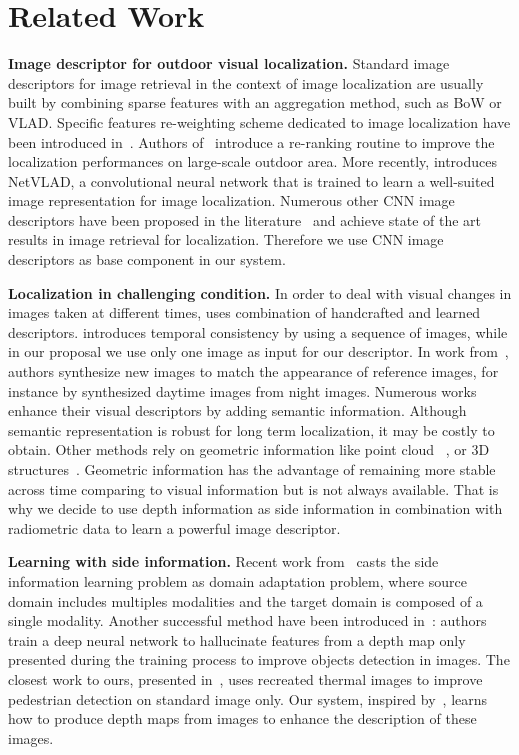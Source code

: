 \section{Related Work}
\label{sec:related_work}

\vspace{4pt}\noindent\textbf{Image descriptor for outdoor visual localization.} Standard image descriptors for image retrieval in the context of image localization are usually built by combining sparse features with an aggregation method, such as BoW or VLAD. Specific features re-weighting scheme dedicated to image localization have been introduced in~\cite{Arandjelovic2014}. Authors of~\cite{Sattler2016} introduce a re-ranking routine to improve the localization performances on large-scale outdoor area. More recently, \cite{Arandjelovic2017} introduces NetVLAD, a convolutional neural network that is trained to learn a well-suited image representation for image localization. Numerous other CNN image descriptors have been proposed in the literature~\cite{Kim2017a,Gordo2017,Radenovic2017,Sunderhauf2015a,Liu2018} and achieve state of the art results in image retrieval for localization. Therefore we use CNN image descriptors as base component in our system.

\vspace{4pt}\noindent\textbf{Localization in challenging condition.} In order to deal with visual changes in images taken at different times, \cite{Naseer2018} uses combination of handcrafted and learned descriptors. \cite{Garg2018} introduces temporal consistency by using a sequence of images, while in our proposal we use only one image as input for our descriptor. In work from~\cite{Porav2018}, authors synthesize new images to match the appearance of reference images, for instance by synthesized daytime images from night images. Numerous works~\cite{Stenborg2018,Toft2018,Naseer2017a} enhance their visual descriptors by adding semantic information. Although semantic representation is robust for long term localization, it may be costly to obtain. Other methods rely on geometric information like point cloud~\cite{Sattler2018,Schonberger2018} , or 3D structures~\cite{Torii2015}. Geometric information has the advantage of remaining more stable across time comparing to visual information but is not always available. That is why we decide to use depth information as side information in combination with radiometric data to learn a powerful image descriptor.

\vspace{4pt}\noindent\textbf{Learning with side information.} Recent work from~\cite{Li2017b} casts the side information learning problem as domain adaptation problem, where source domain includes multiples modalities and the target domain is composed of a single modality. Another successful method have been introduced in~\cite{Hoffman2016}: authors train a deep neural network to hallucinate features from a depth map only presented during the training process to improve objects detection in images. The closest work to ours, presented in~\cite{xu2017learning}, uses recreated thermal images to improve pedestrian detection on standard image only. Our system, inspired by~\cite{xu2017learning}, learns how to produce depth maps from images to enhance the description of these images.

